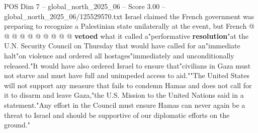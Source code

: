 \begin{textsample}{POS Dim 7 – global\_north\_2025\_06 – Score 3.00 – global\_north\_2025\_06/125529570.txt}
Israel claimed the French government was preparing to recognize a Palestinian state unilaterally at the event, but French @ @ @ @ @ @ @ @ @ @ \textbf{vetoed} what it called a"performative \textbf{resolution}"at the U.N.
Security Council on Thursday that would have called for an"immediate halt"on violence and ordered all hostages"immediately and unconditionally released."It would have also ordered Israel to ensure that"civilians in Gaza must not starve and must have full and unimpeded access to aid.""The United States will not support any measure that fails to condemn Hamas and does not call for it to disarm and leave Gaza,"the U.S.
Mission to the United Nations said in a statement."Any effort in the Council must ensure Hamas can never again be a threat to Israel and should be supportive of our diplomatic efforts on the ground."

\end{textsample}
